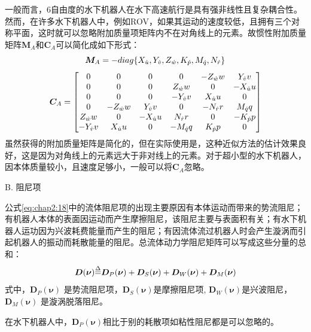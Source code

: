 一般而言，6自由度的水下机器人在水下高速航行是具有强非线性且复杂耦合性。然而，在许多水下机器人中，例如ROV，如果其运动的速度较低，且拥有三个对称平面，这时就可以忽略附加质量项矩阵内不在对角线上的元素。故惯性附加质量矩阵$\bm{M}_A$和$\bm{C}_A$可以简化成如下形式：
\begin{equation}
\centering
\label{eq:chap2:22}
\bm{M}_A = -diag\{X_{\dot u},Y_{\dot v},Z_{\dot w},K_{\dot p},M_{\dot q},N_{\dot r}\}
\end{equation}
\begin{equation}
\label{eq:chap2:23}
\centering
\bm{C}_A  = \begin{bmatrix}
 0           &0            &0               &0                  &-Z_{\dot w} w   & Y_{\dot v} v\\
 0           &0            &0               &Z_{\dot w}w        &0               &-X_{\dot u}u\\
 0           &0            &0               &-Y_{\dot v}v       & X_{\dot u} u   &   0    \\
 0           & -Z_{\dot w}w & Y_{\dot v}v   &  0                & -N_{\dot r}r   & M_{\dot q}q\\
 Z_{\dot w}w &0            &-X_{\dot u}u    & N_{\dot r}r       & 0              &-K_{\dot p}p \\
 -Y_{\dot v}v& X_{\dot u}u &0               &-M_{\dot q}q       & K_{\dot p}p    & 0\\
\end{bmatrix}
\end{equation}
虽然获得的附加质量矩阵是简化的，但在实际使用是，这种近似方法的估计效果良好，这是因为对角线上的元素远大于非对线上的元素。对于超小型的水下机器人，因本体质量较小，且速度足够小，一般可以将$\bm{C}_A$忽略。


B. 阻尼项

公式\ref{eq:chap2:18}中的流体阻尼项的出现主要原因有本体运动而带来的势流阻尼；有机器人本体的表面因运动而产生摩擦阻尼，该阻尼主要与表面积有关；有水下机器人运功因为兴波耗费能量而产生的阻尼；有因流体流过机器人时会产生漩涡而引起机器人的振动而耗散能量的阻尼。总流体动力学阻尼矩阵可以写成这些分量的总和：
\begin{equation}
\label{eq:chap2:24}
\bm{D}({\bm{\nu}})  {\buildrel \Delta \over =} \bm{D}_P(\bm{\nu})+\bm{D}_S(\bm{\nu})+\bm{D}_W(\bm{\nu})+\bm{D}_M(\bm{\nu})
\end{equation}
式中，$\bm{D}_P(\bm{\nu})$ 是势流阻尼项，$\bm{D}_S(\bm{\nu})$是摩擦阻尼项, $\bm{D}_W(\bm{\nu})$是兴波阻尼，$\bm{D}_M(\bm{\nu})$ 是漩涡脱落阻尼。

在水下机器人中，$\bm{D}_P(\bm{\nu})$相比于别的耗散项如粘性阻尼都是可以忽略的。

